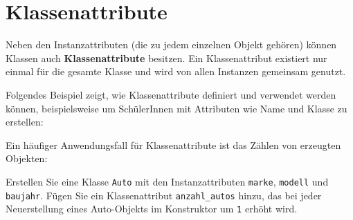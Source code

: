 \section{Klassenattribute}

Neben den Instanzattributen (die zu jedem einzelnen Objekt gehören) können Klassen auch \textbf{Klassenattribute} besitzen. Ein Klassenattribut existiert nur einmal für die gesamte Klasse und wird von allen Instanzen gemeinsam genutzt.

\begin{myexample}[Klassenattribute] Folgendes Beispiel zeigt, wie Klassenattribute definiert und verwendet werden können, beispielsweise um SchülerInnen mit Attributen wie Name und Klasse zu erstellen:

\end{myexample}

\begin{myexample}[Instanzzähler]
Ein häufiger Anwendungsfall für Klassenattribute ist das Zählen von erzeugten Objekten:


\end{myexample}

\begin{myexercise}
	Erstellen Sie eine Klasse \lstinline|Auto| mit den Instanzattributen \lstinline|marke|, \lstinline|modell| und \lstinline|baujahr|. Fügen Sie ein Klassenattribut \lstinline|anzahl_autos| hinzu, das bei jeder Neuerstellung eines Auto-Objekts im Konstruktor um \lstinline|1| erhöht wird.

	\begin{myanswer}
		\leavevmode
		
	\end{myanswer}
\end{myexercise}

